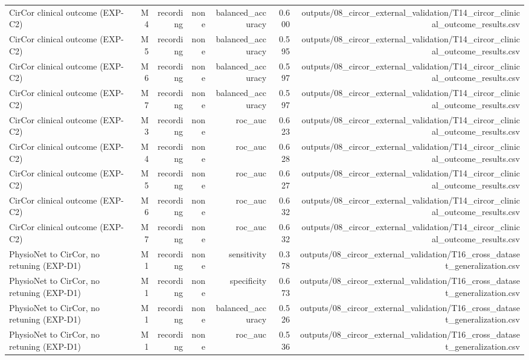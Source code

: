 \begin{table}[htbp]
\begin{tabular}{lrrrrrr}
    CirCor clinical outcome (EXP-C2) & M4 & recording & none & balanced\_accuracy & 0.600 & outputs/08\_circor\_external\_validation/T14\_circor\_clinical\_outcome\_results.csv \\
    CirCor clinical outcome (EXP-C2) & M5 & recording & none & balanced\_accuracy & 0.595 & outputs/08\_circor\_external\_validation/T14\_circor\_clinical\_outcome\_results.csv \\
    CirCor clinical outcome (EXP-C2) & M6 & recording & none & balanced\_accuracy & 0.597 & outputs/08\_circor\_external\_validation/T14\_circor\_clinical\_outcome\_results.csv \\
    CirCor clinical outcome (EXP-C2) & M7 & recording & none & balanced\_accuracy & 0.597 & outputs/08\_circor\_external\_validation/T14\_circor\_clinical\_outcome\_results.csv \\
    CirCor clinical outcome (EXP-C2) & M3 & recording & none & roc\_auc & 0.623 & outputs/08\_circor\_external\_validation/T14\_circor\_clinical\_outcome\_results.csv \\
    CirCor clinical outcome (EXP-C2) & M4 & recording & none & roc\_auc & 0.628 & outputs/08\_circor\_external\_validation/T14\_circor\_clinical\_outcome\_results.csv \\
    CirCor clinical outcome (EXP-C2) & M5 & recording & none & roc\_auc & 0.627 & outputs/08\_circor\_external\_validation/T14\_circor\_clinical\_outcome\_results.csv \\
    CirCor clinical outcome (EXP-C2) & M6 & recording & none & roc\_auc & 0.632 & outputs/08\_circor\_external\_validation/T14\_circor\_clinical\_outcome\_results.csv \\
    CirCor clinical outcome (EXP-C2) & M7 & recording & none & roc\_auc & 0.632 & outputs/08\_circor\_external\_validation/T14\_circor\_clinical\_outcome\_results.csv \\
    PhysioNet to CirCor, no retuning (EXP-D1) & M1 & recording & none & sensitivity & 0.378 & outputs/08\_circor\_external\_validation/T16\_cross\_dataset\_generalization.csv \\
    PhysioNet to CirCor, no retuning (EXP-D1) & M1 & recording & none & specificity & 0.673 & outputs/08\_circor\_external\_validation/T16\_cross\_dataset\_generalization.csv \\
    PhysioNet to CirCor, no retuning (EXP-D1) & M1 & recording & none & balanced\_accuracy & 0.526 & outputs/08\_circor\_external\_validation/T16\_cross\_dataset\_generalization.csv \\
    PhysioNet to CirCor, no retuning (EXP-D1) & M1 & recording & none & roc\_auc & 0.536 & outputs/08\_circor\_external\_validation/T16\_cross\_dataset\_generalization.csv \\

\end{tabular}
\end{table}
